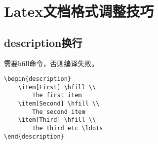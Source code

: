 \section{Latex文档格式调整技巧}
\subsection{description换行}
需要hfill命令，否则编译失败。
\begin{verbatim}
\begin{description}
    \item[First] \hfill \\
        The first item
    \item[Second] \hfill \\
        The second item
    \item[Third] \hfill \\
        The third etc \ldots
\end{description}
\end{verbatim}


